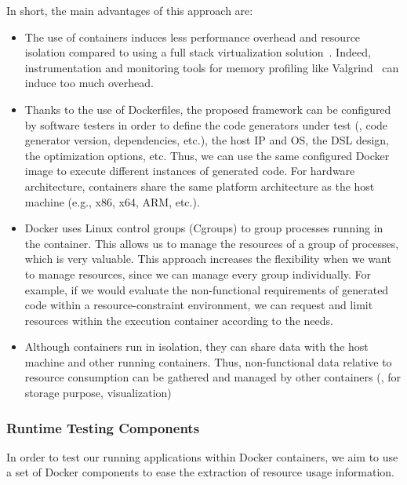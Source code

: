 In short, the main advantages of this approach are:
\begin{itemize}
	\item The use of containers induces less performance overhead and resource isolation compared to using a full stack virtualization solution~\cite{spoiala2016performance}. Indeed, instrumentation and monitoring tools for memory profiling like Valgrind~\cite{nethercote2007valgrind} can induce too much overhead.
	\item Thanks to the use of Dockerfiles, the proposed framework can be  configured by software testers in order to define the code generators under test (\eg, code generator version, dependencies, etc.), the host IP and OS, the DSL design, the optimization options, etc. Thus, we can use the same configured Docker image to execute different instances of generated code. For hardware architecture, containers share the same platform architecture as the host machine (e.g., x86, x64, ARM, etc.). 
	\item Docker uses Linux control groups (Cgroups) to group processes running in the container. This allows us to manage the resources of a group of processes, which is very valuable. 
	This approach increases the flexibility when we want to manage resources, since we can manage every group individually. For example, if we would evaluate the non-functional requirements of generated code within a resource-constraint environment, we can  request and limit resources within the execution container according to the needs.
	\item Although containers run in isolation, they can share data with the host machine and other running containers. Thus, non-functional data relative to resource consumption can be gathered and managed by other containers (\ie, for storage purpose, visualization)
\end{itemize}




\subsubsection{Runtime Testing Components}
In order to test our running applications within Docker containers, we aim to use a set of Docker components to ease the extraction of resource usage information.
